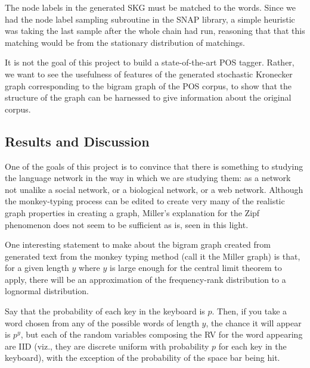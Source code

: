 \documentclass[12pt]{article}
\begin{document}

The node labels in the generated SKG must be matched to the words. Since we had the node label sampling subroutine in the SNAP library, a simple heuristic was taking the last sample after the whole chain had run, reasoning that that this matching would be from the stationary distribution of matchings.


It is not the goal of this project to build a state-of-the-art POS tagger. Rather, we want to see the usefulness of features of the generated stochastic Kronecker graph corresponding to the bigram graph of the POS corpus, to show that the structure of the graph can be harnessed to give information about the original corpus.



\subsection{Results and Discussion}

One of the goals of this project is to convince that there is something to studying the language network in the way in which we are studying them: as a network not unalike a social network, or a biological network, or a web network. Although the monkey-typing process can be edited to create very many of the realistic graph properties in creating a graph, Miller's explanation for the Zipf phenomenon does not seem to be sufficient as is, seen in this light.

One interesting statement to make about the bigram graph created from generated text from the monkey typing method (call it the Miller graph) is that, for a given length $y$ where $y$ is large enough for the central limit theorem to apply, there will be an approximation of the frequency-rank distribution to a lognormal distribution.

Say that the probability of each key in the keyboard is $p$. Then, if you take a word chosen from any of the possible words of length $y$, the chance it will appear is $p^y$, but each of the random variables composing the RV for the word appearing are IID (viz., they are discrete uniform with probability $p$ for each key in the keyboard), with the exception of the probability of the space bar being hit.
\end{document}
